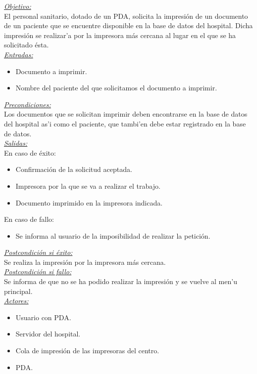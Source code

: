 \emph{\underline{Objetivo:}}\bigskip \\ El personal sanitario, dotado de un PDA, solicita la impresi\'on de un documento de un paciente que se encuentre disponible en la base de datos del hospital. Dicha impresi\'on se realizar'a por la impresora m\'as cercana al lugar en el que se ha solicitado \'esta.\bigskip \\ \emph{\underline{Entradas:}} 
\begin{itemize}
\item Documento a imprimir.
\item Nombre del paciente del que solicitamos el documento a imprimir.
\end{itemize}

\emph{\underline{Precondiciones:}}\bigskip \\ Los documentos que se solicitan imprimir deben encontrarse en la base de datos del hospital as'i como el paciente, que tambi'en debe estar registrado en la base de datos.\bigskip \\ \emph{\underline{Salidas:}}\bigskip \\ En caso de \'exito: 
\begin{itemize}
	\item Confirmaci\'on de la solicitud aceptada.
	\item Impresora por la que se va a realizar el trabajo.
	\item Documento imprimido en la impresora indicada.
\end{itemize}
En caso de fallo: 
\begin{itemize}
	\item Se informa al usuario de la imposibilidad de realizar la petici\'on.
\end{itemize}

\emph{\underline{Postcondici\'on si \'exito:}}\bigskip \\ Se realiza la impresi\'on por la impresora m\'as cercana.\bigskip \\ \emph{\underline{Postcondici\'on si fallo:}}\bigskip \\ Se informa de que no se ha podido realizar la impresi\'on y se vuelve al men'u principal.\bigskip \\ \emph{\underline{Actores: }}
\begin{itemize}
\item Usuario con PDA.
\item Servidor del hospital.
\item Cola de impresi\'on de las impresoras del centro.
\item PDA.
\end{itemize}

